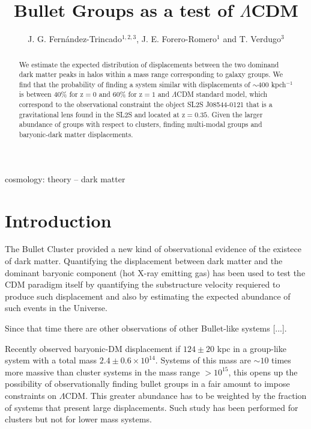 \documentclass{emulateapj}
\newcommand{\hMsun}{{\ifmmode{h^{-1}{\rm {M_{\odot}}}}\else{$h^{-1}{\rm{M_{\odot}}}$}\fi}}
\newcommand{\Msun}{{\ifmmode{{\rm {M_{\odot}}}}\else{${\rm{M_{\odot}}}$}\fi}}
\begin{document}
 

\title{Bullet Groups as a test of $\Lambda$CDM}
\author{J. G. Fern\'andez-Trincado$^{1,2,3}$, J. E. Forero-Romero$^1$
  and T. Verdugo$^3$} 

\begin{abstract}
We estimate the expected distribution of displacements between the two
dominand dark matter peaks in halos within a mass range corresponding
to galaxy groups. We find that the probability of finding a system
similar with displacements of $\sim$400 kpch$^{-1}$ is between 40\%
for z$=0$ and 60\% for z$=1$ and $\Lambda$CDM standard model, which
correspond to the observational constraint the object SL2S J08544-0121
that is  a gravitational lens found in the SL2S and located at
z$=0.35$. Given the larger abundance of groups with respect to
clusters, finding multi-modal groups and baryonic-dark matter
displacements.  
\end{abstract}

\begin{keywords}
{cosmology: theory -- dark matter} 
\end{keywords}

\section{Introduction}


The Bullet Cluster provided a new kind of observational evidence of
the existece of dark matter. Quantifying the displacement between dark
matter and the dominant baryonic component (hot X-ray emitting gas)
has been used to test the CDM paradigm itself by quantifying the
substructure velocity requiered to produce such displacement and also
by estimating the expected abundance of such events in the Universe.

Since that time there are other observations of other Bullet-like
systems [...].

Recently \citep{Gastaldello} observed baryonic-DM displacement if
$124\pm 20$ kpc in a group-like system with a total mass $2.4\pm 0.6
\times 10^{14}$\Msun. Systems of this mass are $\sim 10$ times more massive
than cluster systems in the mass range $>10^{15}$\hMsun, this opens
up the possibility of observationally finding bullet groups in a fair
amount to impose constraints on $\Lambda$CDM. This greater abundance
has to be weighted by the fraction of systems that present large
displacements. Such study has been performed for clusters but not for
lower mass systems.
\end{document}
